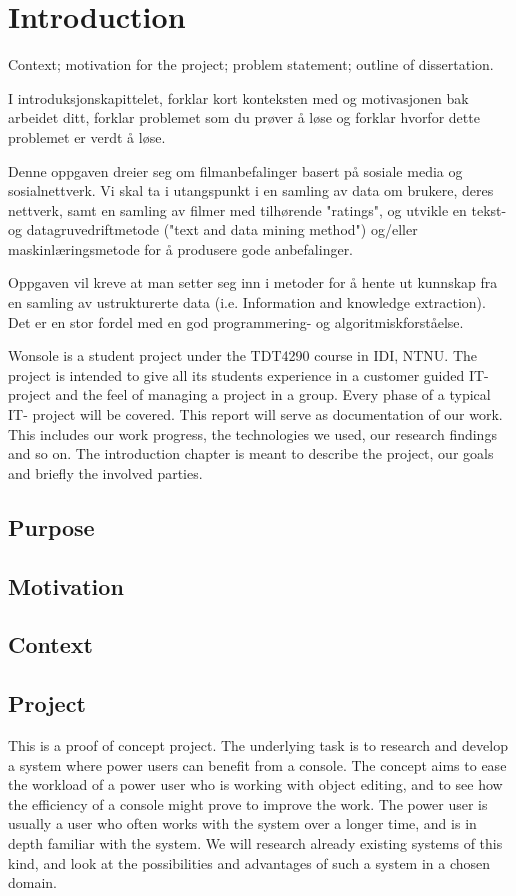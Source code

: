 \chapter{Introduction}

\minitoc
\setcounter{page}{1}

Context;  motivation  for the project;  problem statement;  outline of
dissertation.

I introduksjonskapittelet, forklar kort
konteksten med og motivasjonen bak arbeidet
ditt, forklar problemet som du prøver å løse og
forklar hvorfor dette problemet er verdt å løse.


Denne oppgaven dreier seg om filmanbefalinger basert på sosiale media og sosialnettverk. Vi skal ta i utangspunkt i en samling av data om brukere, deres nettverk, samt en samling av filmer med tilhørende "ratings", og utvikle en tekst- og datagruvedriftmetode ("text and data mining method")  og/eller maskinlæringsmetode for å produsere gode anbefalinger.

Oppgaven vil kreve at man setter seg inn i metoder for å hente ut kunnskap fra en samling av ustrukturerte data (i.e. Information and knowledge extraction). Det er en stor fordel med en god programmering- og algoritmiskforståelse.


Wonsole is a student project under the TDT4290 course in IDI, NTNU. The project is intended to give all its students experience in a customer guided IT- project and the feel of managing a project in a group. Every phase of a typical IT- project will be covered. This report will serve as documentation of our work. This includes our work progress, the technologies we used, our research findings and so on. The introduction chapter is meant to describe the project, our goals and briefly the involved parties.

\clearpage


\section{Purpose}
\section{Motivation}
\section{Context}

\section{Project}
This is a proof of concept project. The underlying task is to research and develop a system where power users can benefit from a console.  The concept aims to ease the workload of a power user who is working with object editing, and to see how the efficiency of a console might prove to improve the work. The power user is usually a user who often works with the system over a longer time, and is in depth familiar with the system. We will research already existing systems of this kind, and look at the possibilities and advantages of such a system in a chosen domain.


